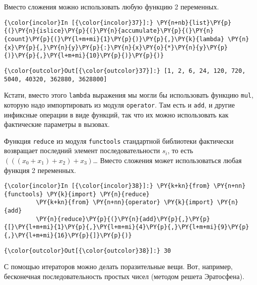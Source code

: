     Вместо сложения можно использовать любую функцию 2 переменных.

    \begin{Verbatim}[commandchars=\\\{\}]
{\color{incolor}In [{\color{incolor}37}]:} \PY{n+nb}{list}\PY{p}{(}\PY{n}{islice}\PY{p}{(}\PY{n}{accumulate}\PY{p}{(}\PY{n}{count}\PY{p}{(}\PY{l+m+mi}{1}\PY{p}{)}\PY{p}{,}\PY{k}{lambda} \PY{n}{x}\PY{p}{,}\PY{n}{y}\PY{p}{:}\PY{n}{x}\PY{o}{*}\PY{n}{y}\PY{p}{)}\PY{p}{,}\PY{l+m+mi}{10}\PY{p}{)}\PY{p}{)}
\end{Verbatim}


\begin{Verbatim}[commandchars=\\\{\}]
{\color{outcolor}Out[{\color{outcolor}37}]:} [1, 2, 6, 24, 120, 720, 5040, 40320, 362880, 3628800]
\end{Verbatim}
            
    Кстати, вместо этого \texttt{lambda} выражения мы могли бы использовать
функцию \texttt{mul}, которую надо импортировать из модуля
\texttt{operator}. Там есть и \texttt{add}, и другие инфиксные операции
в виде функций, так что их можно использовать как фактические параметры
в вызовах.

Функция \texttt{reduce} из модуля \texttt{functools} стандартной
библиотеки фактически возвращает последний элемент последовательности
\(s_i\), то есть \((((x_0+x_1)+x_2)+x_3)\)\dots{} Вместо сложения может
использоваться любая функция 2 переменных.

    \begin{Verbatim}[commandchars=\\\{\}]
{\color{incolor}In [{\color{incolor}38}]:} \PY{k+kn}{from} \PY{n+nn}{functools} \PY{k}{import} \PY{n}{reduce}
         \PY{k+kn}{from} \PY{n+nn}{operator} \PY{k}{import} \PY{n}{add}
         \PY{n}{reduce}\PY{p}{(}\PY{n}{add}\PY{p}{,}\PY{p}{[}\PY{l+m+mi}{1}\PY{p}{,}\PY{l+m+mi}{4}\PY{p}{,}\PY{l+m+mi}{9}\PY{p}{,}\PY{l+m+mi}{16}\PY{p}{]}\PY{p}{)}
\end{Verbatim}


\begin{Verbatim}[commandchars=\\\{\}]
{\color{outcolor}Out[{\color{outcolor}38}]:} 30
\end{Verbatim}
            
    С помощью итераторов можно делать поразительные вещи. Вот, например,
бесконечная последовательность простых чисел (методом решета
Эратосфена).

